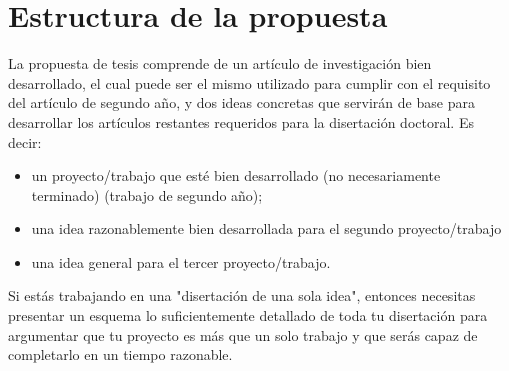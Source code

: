 \section{Estructura de la propuesta}

La propuesta de tesis comprende de un artículo de investigación bien desarrollado, el cual puede ser el mismo utilizado para cumplir con el requisito del artículo de segundo año, y dos ideas concretas que servirán de base para desarrollar los artículos restantes requeridos para la disertación doctoral. Es decir: 
    \begin{itemize}
        \item un proyecto/trabajo que esté bien desarrollado (no necesariamente terminado) (trabajo de segundo año);
        \item una idea razonablemente bien desarrollada para el segundo proyecto/trabajo
        \item una idea general para el tercer proyecto/trabajo.
    \end{itemize}

Si estás trabajando en una "disertación de una sola idea", entonces necesitas presentar un esquema lo suficientemente detallado de toda tu disertación para argumentar que tu proyecto es más que un solo trabajo y que serás capaz de completarlo en un tiempo razonable.


